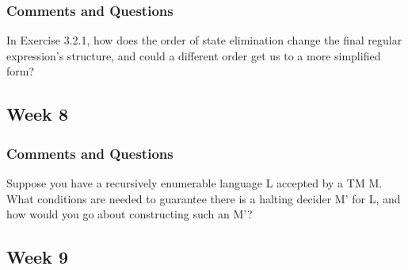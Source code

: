\documentclass{article}
\theoremstyle{theorem}
\theoremstyle{definition}
\theoremstyle{remark}
\begin{document}
\subsubsection*{Comments and Questions}

In Exercise 3.2.1, how does the order of state elimination change the final regular expression’s structure, and could a different order get us to a more simplified form?

\subsection{Week 8}


\subsubsection*{Comments and Questions}

Suppose you have a recursively enumerable language L accepted by a TM M. What conditions are needed to guarantee there is a halting decider M' for L, and how would you go about constructing such an M'?

\subsection{Week 9}



\end{document}
